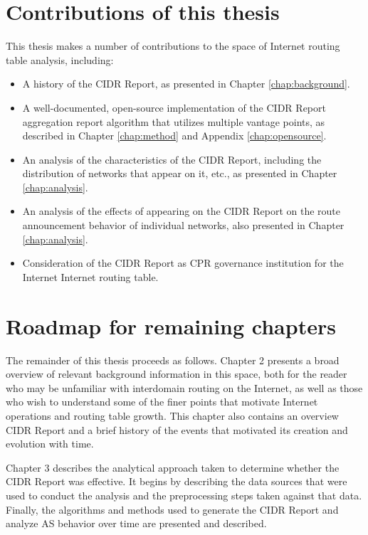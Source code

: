 \section{Contributions of this thesis}

This thesis makes a number of contributions to the space of Internet routing table analysis, including:
\begin{itemize}
\item{A history of the CIDR Report, as presented in Chapter \ref{chap:background}.}
\item{A well-documented, open-source implementation of the CIDR Report aggregation report algorithm that utilizes multiple vantage points, as described in Chapter \ref{chap:method} and Appendix \ref{chap:opensource}.}
\item{An analysis of the characteristics of the CIDR Report, including the distribution of networks that appear on it, etc., as presented in Chapter \ref{chap:analysis}.}
\item{An analysis of the effects of appearing on the CIDR Report on the route announcement behavior of individual networks, also presented in Chapter \ref{chap:analysis}.}
\item{Consideration of the CIDR Report as CPR governance institution for the Internet Internet routing table.}
\end{itemize}

\section{Roadmap for remaining chapters}

The remainder of this thesis proceeds as follows. Chapter 2 presents a broad overview of relevant background information in this space, both for the reader who may be unfamiliar with interdomain routing on the Internet, as well as those who wish to understand some of the finer points that motivate Internet operations and routing table growth. This chapter also contains an overview CIDR Report and a brief history of the events that motivated its creation and evolution with time. 

Chapter 3 describes the analytical approach taken to determine whether the CIDR Report was effective. It begins by describing the data sources that were used to conduct the analysis and the preprocessing steps taken against that data. Finally, the algorithms and methods used to generate the CIDR Report and analyze AS behavior over time are presented and described. 

